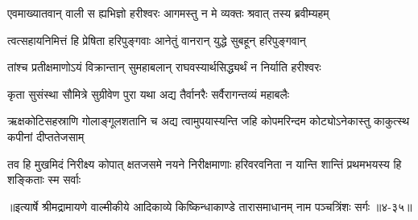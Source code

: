 \twolineshloka
{एवमाख्यातवान् वाली स ह्यभिज्ञो हरीश्वरः}
{आगमस्तु न मे व्यक्तः श्रवात् तस्य ब्रवीम्यहम्} %

\twolineshloka
{त्वत्सहायनिमित्तं हि प्रेषिता हरिपुङ्गवाः}
{आनेतुं वानरान् युद्धे सुबहून् हरिपुङ्गवान्} %

\twolineshloka
{तांश्च प्रतीक्षमाणोऽयं विक्रान्तान् सुमहाबलान्}
{राघवस्यार्थसिद्ध्यर्थं न निर्याति हरीश्वरः} %

\twolineshloka
{कृता सुसंस्था सौमित्रे सुग्रीवेण पुरा यथा}
{अद्य तैर्वानरैः सर्वैरागन्तव्यं महाबलैः} %

\threelineshloka
{ऋक्षकोटिसहस्राणि गोलाङ्गूलशतानि च}
{अद्य त्वामुपयास्यन्ति जहि कोपमरिन्दम}
{कोट्योऽनेकास्तु काकुत्स्थ कपीनां दीप्ततेजसाम्} %

\twolineshloka
{तव हि मुखमिदं निरीक्ष्य कोपात् क्षतजसमे नयने निरीक्षमाणाः}
{हरिवरवनिता न यान्ति शान्तिं प्रथमभयस्य हि शङ्किताः स्म सर्वाः} %


॥इत्यार्षे श्रीमद्रामायणे वाल्मीकीये आदिकाव्ये किष्किन्धाकाण्डे तारासमाधानम् नाम पञ्चत्रिंशः सर्गः ॥४-३५॥

